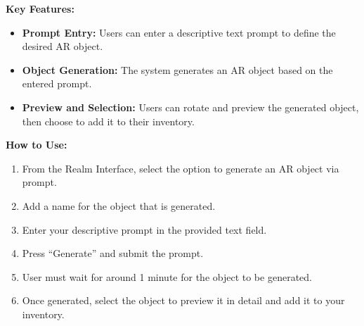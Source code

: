 \documentclass[12pt, titlepage]{article}
\begin{document}
\textbf{Key Features:}
\begin{itemize}[leftmargin=*]
    \item \textbf{Prompt Entry:} Users can enter a descriptive text prompt to define the desired AR object.
    \item \textbf{Object Generation:} The system generates an AR object based on the entered prompt.
    \item \textbf{Preview and Selection:} Users can rotate and preview the generated object, then choose to add it to their inventory.
\end{itemize}

\textbf{How to Use:}
\begin{enumerate}[leftmargin=*]
    \item From the Realm Interface, select the option to generate an AR object via prompt.
    \item Add a name for the object that is generated.
    \item Enter your descriptive prompt in the provided text field.
    \item Press ``Generate'' and submit the prompt.
    \item User must wait for around 1 minute for the object to be generated.
    \item Once generated, select the object to preview it in detail and add it to your inventory.
\end{enumerate}
\end{document}
